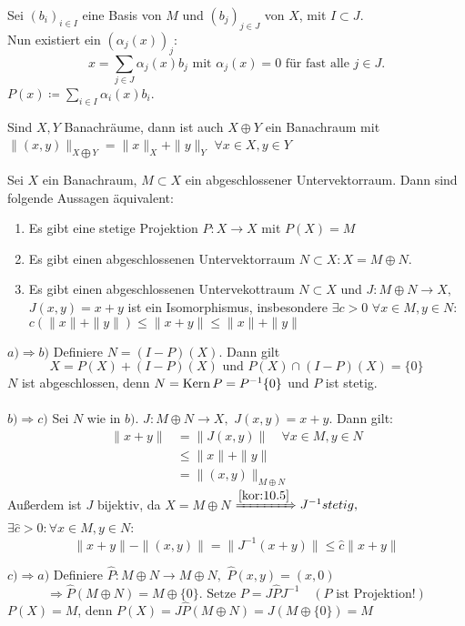 \begin{beweis}
	Sei $(b_{i})_{i \in I}$ eine Basis von $M$ und $(b_{j})_{j \in J}$ von $X$, mit $I \subset J$. \\
	Nun existiert ein $(\alpha_{j}(x))_{j}$:
	\[ x = \sum_{j \in J} \alpha_{j}(x) b_{j} \text{ mit } \alpha_{j}(x) = 0 \text{ für fast alle } j \in J. \]
	$P(x) \coloneqq \sum_{i \in I} \alpha_{i}(x) b_{i}$.
\end{beweis}


\begin{erinnerung}
	Sind $X, Y$ Banachräume, dann ist auch $X \oplus Y$ ein Banachraum mit $\| (x, y) \|_{X \bigoplus Y} = \| x \|_{X} + \| y \|_{Y}$ $\forall x \in X, y \in Y$
\end{erinnerung}

\newpage %

\begin{satz} \label{satz:11.4}
	Sei $X$ ein Banachraum, $M \subset X$ ein abgeschlossener Untervektorraum. Dann sind folgende Aussagen äquivalent:
	\begin{enumerate}[label=\alph*\upshape)]
		\item Es gibt eine stetige Projektion $P \colon X \rightarrow X$ mit $P(X) = M$
		\item Es gibt einen abgeschlossenen Untervektorraum $N \subset X: X = M \oplus N$.
		\item Es gibt einen abgeschlossenen Untervekottraum $N \subset X$ und $J: M \oplus N \rightarrow X,$ $J(x, y) = x + y$ ist ein Isomorphismus, insbesondere $\exists c > 0$ $\forall x \in M, y \in N:$ $c \left( \|x \| + \|y \| \right) \leq \|x + y \| \leq \|x \| + \| y \| $
	\end{enumerate}
\end{satz}

\begin{beweis}
	$a) \Rightarrow b)$ Definiere $N = (I - P)(X)$. Dann gilt
		\[ X = P(X) + (I - P)(X) \text{ und } P(X) \cap (I - P)(X) = \{ 0 \} \]
		$N$ ist abgeschlossen, denn $N = \mathop{\rm Kern}\nolimits{P} = P^{-1}\{ 0 \}$ und $P$ ist stetig.	\\ \\
	$b) \Rightarrow c)$ Sei $N$ wie in $b)$. $J: M \oplus N \rightarrow X,$ $J(x, y) = x + y$. Dann gilt:
		\begin{align*}
			\| x + y \| & = \| J(x, y) \| \quad \forall x \in M, y \in N \\
						& \leq \| x \| + \| y \| \\
						& = \| (x, y) \|_{M \oplus N}
		\end{align*}
		Au{\ss}erdem ist $J$ bijektiv, da $X = M \oplus N$
		$\xRightarrow[]{\ref{kor:10.5}} J^{-1} stetig,$ $\exists \hat{c} > 0: \forall x \in M, y \in N$:
		\[ \| x + y \| - \| (x, y) \| = \| J^{-1}(x + y) \| \leq \hat{c} \| x + y \| \]

	$c) \Rightarrow a)$ Definiere $\hat{P} \colon M \oplus N \rightarrow M \oplus N,$ $\hat{P}(x, y) = (x, 0)$
		\[ \Rightarrow \hat{P}(M \oplus N) = M \oplus \{ 0 \}. \text{ Setze } P = J \hat{P} J^{-1} \quad (P \text{ ist Projektion!}) \]
		$P(X) = M$, denn $P(X) = J \hat{P}(M \oplus N) = J (M \oplus \{ 0 \}) = M$
\end{beweis}


